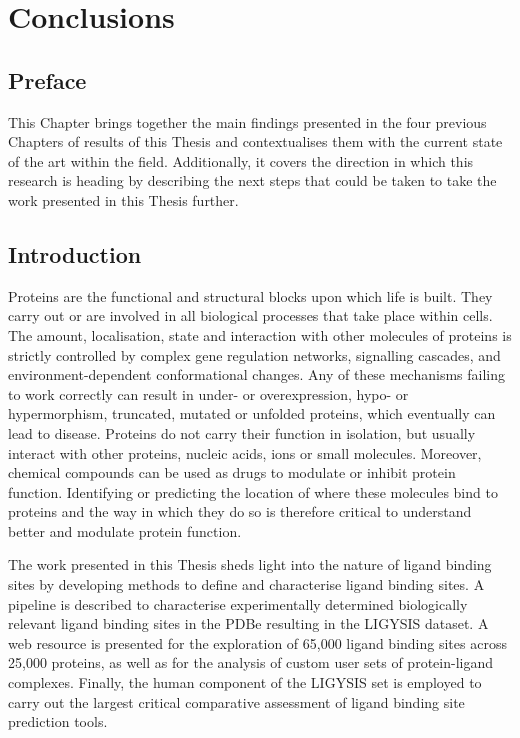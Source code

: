 \chapter{Conclusions}

\section*{Preface}

This Chapter brings together the main findings presented in the four previous Chapters of results of this Thesis and contextualises them with the current state of the art within the field. Additionally, it covers the direction in which this research is heading by describing the next steps that could be taken to take the work presented in this Thesis further.

\section{Introduction}

Proteins are the functional and structural blocks upon which life is built. They carry out or are involved in all biological processes that take place within cells. The amount, localisation, state and interaction with other molecules of proteins is strictly controlled by complex gene regulation networks, signalling cascades, and environment-dependent conformational changes. Any of these mechanisms failing to work correctly can result in under- or overexpression, hypo- or hypermorphism, truncated, mutated or unfolded proteins, which eventually can lead to disease. Proteins do not carry their function in isolation, but usually interact with other proteins, nucleic acids, ions or small molecules. Moreover, chemical compounds can be used as drugs to modulate or inhibit protein function. Identifying or predicting the location of where these molecules bind to proteins and the way in which they do so is therefore critical to understand better and modulate protein function.

The work presented in this Thesis sheds light into the nature of ligand binding sites by developing methods to define and characterise ligand binding sites. A pipeline is described to characterise experimentally determined biologically relevant ligand binding sites in the PDBe resulting in the LIGYSIS dataset. A web resource is presented for the exploration of 65,000 ligand binding sites across 25,000 proteins, as well as for the analysis of custom user sets of protein-ligand complexes. Finally, the human component of the LIGYSIS set is employed to carry out the largest critical comparative assessment of ligand binding site prediction tools. %

